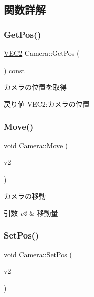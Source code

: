 \subsection{関数詳解}
\mbox{\label{class_camera_ac3b4f1248489c0ac0faa521329de71cd}} 
\subsubsection{\texorpdfstring{Get\+Pos()}{GetPos()}}
{\footnotesize\ttfamily \mbox{\hyperlink{transform_8h_afb0c5e21d4133ff4f200992c0b534e1b}{V\+E\+C2}} Camera\+::\+Get\+Pos (\begin{DoxyParamCaption}{ }\end{DoxyParamCaption}) const}



カメラの位置を取得 

\begin{DoxyReturn}{戻り値}
V\+E\+C2\+:カメラの位置 
\end{DoxyReturn}
\mbox{\label{class_camera_a5c6b7ad424d835a3022393099886a90b}} 
\subsubsection{\texorpdfstring{Move()}{Move()}}
{\footnotesize\ttfamily void Camera\+::\+Move (\begin{DoxyParamCaption}\item[{const \mbox{\hyperlink{transform_8h_afb0c5e21d4133ff4f200992c0b534e1b}{V\+E\+C2}} \&}]{v2 }\end{DoxyParamCaption})}



カメラの移動 


\begin{DoxyParams}{引数}
{\em v2} & 移動量 \\
\hline
\end{DoxyParams}
\mbox{\label{class_camera_af79aa3fedd030712e7fa122a2ea88b48}} 
\subsubsection{\texorpdfstring{Set\+Pos()}{SetPos()}}
{\footnotesize\ttfamily void Camera\+::\+Set\+Pos (\begin{DoxyParamCaption}\item[{const \mbox{\hyperlink{transform_8h_afb0c5e21d4133ff4f200992c0b534e1b}{V\+E\+C2}} \&}]{v2 }\end{DoxyParamCaption})}



